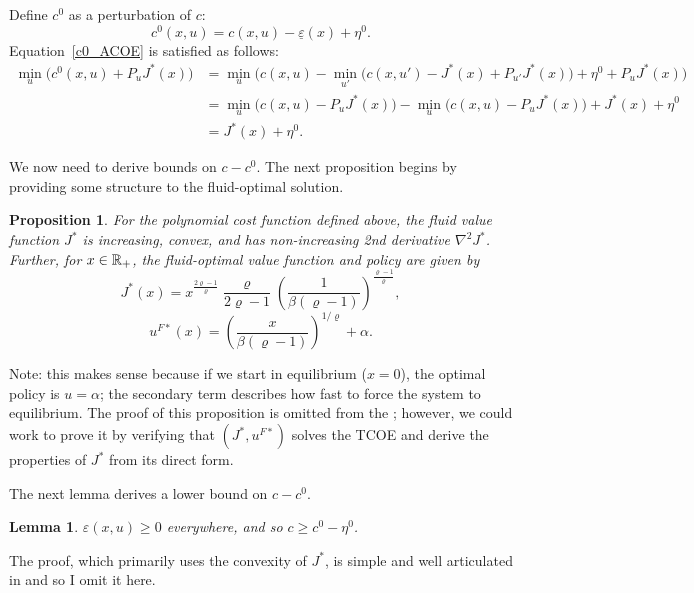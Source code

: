 \documentclass[11pt]{article}
\newtheorem{lemma}{Lemma}
\newtheorem{proposition}{Proposition}
\begin{document}
Define $c^0$ as a perturbation of $c$:
$$c^0(x,u) = c(x,u) - \underline \varepsilon(x) + \eta^0.$$
Equation~\ref{c0_ACOE} is satisfied as follows:
$$\begin{aligned}
\min_u \Big(c^0(x,u) + P_u J^*(x) \Big) &= \min_u \Big( c(x,u) - \min_{u'} \big( c(x,u') - J^*(x) + P_{u'} J^*(x)\big) + \eta^0 + P_u J^*(x)\Big) \\
	&= \min_u \Big( c(x,u) - P_u J^*(x) \Big) - \min_u \Big( c(x,u) - P_u J^*(x) \Big) + J^*(x) + \eta^0 \\
	&= J^*(x) + \eta^0.
\end{aligned}$$

We now need to derive bounds on $c-c^0$. The next proposition begins by providing some structure to the fluid-optimal solution.

\begin{proposition} \label{prop:poly_struct}
For the polynomial cost function defined above, the fluid value function $J^*$ is increasing, convex, and has non-increasing 2nd derivative $\nabla^2J^*$. Further, for $x\in \mathbb{R}_+$, the fluid-optimal value function and policy are given by
$$J^*(x) = x^{\frac{2\varrho-1}{\varrho}} \frac{\varrho}{2\varrho-1} \left( \frac{1}{\beta (\varrho - 1)}\right)^{\frac{\varrho -1}{\varrho}},$$
$$u^{F*}(x) = \left( \frac{x}{\beta(\varrho-1)}\right)^{1/\varrho} + \alpha.$$
\end{proposition}

Note: this makes sense because if we start in equilibrium ($x=0$), the optimal policy is $u=\alpha$; the secondary term describes how fast to force the system to equilibrium. The proof of this proposition is omitted from the \cite{paper}; however, we could work to prove it by verifying that $(J^*, u^{F*})$ solves the TCOE and derive the properties of $J^*$ from its direct form.

The next lemma derives a lower bound on $c-c^0$.
\begin{lemma}
$\varepsilon(x,u)\geq 0$ everywhere, and so $c \geq c^0 - \eta^0$.
\end{lemma}

The proof, which primarily uses the convexity of $J^*$, is simple and well articulated in \cite{paper} and so I omit it here.
\end{document}
